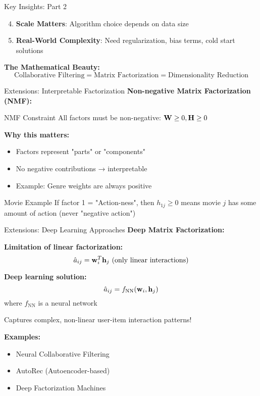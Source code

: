 \documentclass{beamer}
\begin{document}
\begin{frame}{Key Insights: Part 2}  
\begin{enumerate}[<+->]
    \setcounter{enumi}{3}
    \item \textbf{Scale Matters}: Algorithm choice depends on data size
    
    \item \textbf{Real-World Complexity}: Need regularization, bias terms, cold start solutions
\end{enumerate}

\pause
\textbf{The Mathematical Beauty:}
\begin{equation*}
\boxed{\text{Collaborative Filtering} = \text{Matrix Factorization} = \text{Dimensionality Reduction}}
\end{equation*}
\end{frame}

\begin{frame}{Extensions: Interpretable Factorization}
\textbf{Non-negative Matrix Factorization (NMF):}

\pause
\begin{definitionbox}{NMF Constraint}
All factors must be non-negative: $\mathbf{W} \geq 0, \mathbf{H} \geq 0$
\end{definitionbox}

\pause
\textbf{Why this matters:}
\begin{itemize}[<+->]
    \item Factors represent "parts" or "components"
    \item No negative contributions → interpretable
    \item Example: Genre weights are always positive
\end{itemize}

\pause
\begin{examplebox}{Movie Example}
If factor 1 = "Action-ness", then $h_{1j} \geq 0$ means movie $j$ has some amount of action (never "negative action")
\end{examplebox}
\end{frame}

\begin{frame}{Extensions: Deep Learning Approaches}
\textbf{Deep Matrix Factorization:}

\pause
\textbf{Limitation of linear factorization:}
$$\hat{a}_{ij} = \mathbf{w}_i^T \mathbf{h}_j \text{ (only linear interactions)}$$

\pause
\textbf{Deep learning solution:}
$$\hat{a}_{ij} = f_{\text{NN}}(\mathbf{w}_i, \mathbf{h}_j)$$
where $f_{\text{NN}}$ is a neural network

\pause
\begin{keypointsbox}{}
Captures complex, non-linear user-item interaction patterns!
\end{keypointsbox}

\pause
\textbf{Examples:}
\begin{itemize}[<+->]
    \item Neural Collaborative Filtering
    \item AutoRec (Autoencoder-based)
    \item Deep Factorization Machines
\end{itemize}
\end{frame}
\end{document}
